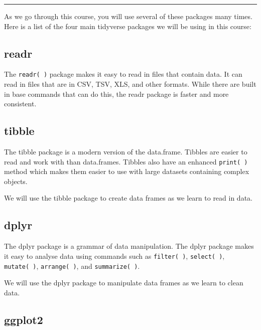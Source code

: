 \documentclass[
  letterpaper,
  DIV=11,
  numbers=noendperiod]{scrreprt}
\begin{document}
\begin{center}\rule{0.5\linewidth}{0.5pt}\end{center}

As we go through this course, you will use several of these packages
many times. Here is a list of the four main tidyverse packages we will
be using in this course:

\subsection*{readr}\label{readr}

The \texttt{readr(\ )} package makes it easy to read in files that
contain data. It can read in files that are in CSV, TSV, XLS, and other
formats. While there are built in base commands that can do this, the
readr package is faster and more consistent.

\subsection*{tibble}\label{tibble}

The tibble package is a modern version of the data.frame. Tibbles are
easier to read and work with than data.frames. Tibbles also have an
enhanced \texttt{print(\ )} method which makes them easier to use with
large datasets containing complex objects.

We will use the tibble package to create data frames as we learn to read
in data.

\subsection*{dplyr}\label{dplyr}

The dplyr package is a grammar of data manipulation. The dplyr package
makes it easy to analyse data using commands such as
\texttt{filter(\ )}, \texttt{select(\ )}, \texttt{mutate(\ )},
\texttt{arrange(\ )}, and \texttt{summarize(\ )}.

We will use the dplyr package to manipulate data frames as we learn to
clean data.

\subsection*{ggplot2}\label{ggplot2}
\end{document}
